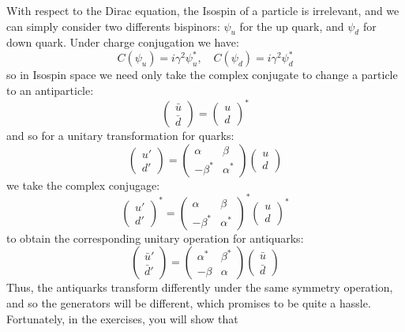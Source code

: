 \documentclass[12pt]{article}
\begin{document}
With respect to the Dirac equation, the Isospin of a particle is
irrelevant, and we can simply consider two differents bispinors:
$\psi_u$ for the up quark, and $ \psi_d$ for down quark.  Under charge
conjugation we have:
$$C(\psi_u) = i \gamma^2 \psi_u^*, \quad C(\psi_d) = i \gamma^2
\psi_d^*$$
so in Isospin space we need only take the complex conjugate
to change a particle to an antiparticle:
$$\begin{pmatrix} \bar{u} \\ \bar{d}\end{pmatrix}
= \begin{pmatrix} u \\ d\end{pmatrix}^*
$$
and so for a unitary transformation for quarks:
$$\begin{pmatrix} u' \\ d' \end{pmatrix} =     
   \begin{pmatrix}\alpha & \beta \\ -\beta^* & \alpha^* \end{pmatrix}
\begin{pmatrix} u \\ d \end{pmatrix}$$
we take the complex conjugage:
$$\begin{pmatrix} u' \\ d' \end{pmatrix}^* =     
   \begin{pmatrix}\alpha & \beta \\ -\beta^* & \alpha^* \end{pmatrix}^*
\begin{pmatrix} u \\ d \end{pmatrix}^*$$
to obtain the corresponding unitary operation for antiquarks:
$$\begin{pmatrix} \bar{u}' \\ \bar{d}' \end{pmatrix} =     
   \begin{pmatrix}\alpha^* & \beta^* \\ -\beta & \alpha \end{pmatrix}
\begin{pmatrix} \bar{u} \\ \bar{d} \end{pmatrix}$$
Thus, the antiquarks transform differently under the same symmetry
operation, and so the generators will be different, which promises to
be quite a hassle.  Fortunately, in the exercises, you will show that
\end{document}
